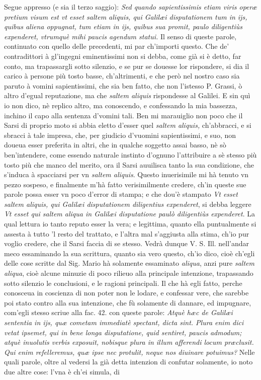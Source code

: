\documentclass[11pt,twoside,openany]{book}
\begin{document}
\par\bigskip\noindent{}\enspace Segue appresso (e sia il terzo saggio): \textit{Sed quando sapientissimis etiam viris operæ pretium visum est vt esset saltem aliquis, qui Galilæi disputationem tum in ijs, quibus aliena oppugnat, tum etiam in ijs, quibus sua promit, paulo diligentiùs expenderet, vtrumquè mihi paucis agendum statui. }Il senso di queste parole, continuato con quello delle precedenti, mi par ch'importi questo. Che de' contradittori à gl'ingegni eminentissimi non si debba, come già si è detto, far conto, ma trapassargli sotto silenzio, e se pur se douesse lor rispondere, si dia il carico à persone più tosto basse, ch'altrimenti, e che però nel nostro caso sia paruto à vomini sapientissimi, che sia ben fatto, che non l'istesso P. Grassi, ò altro d'egual reputazione, ma che \textit{saltem aliquis} rispondesse al Galilei. E sin quì io non dico, nè replico altro, ma conoscendo, e confessando la mia bassezza, inchino il capo alla sentenza d'vomini tali. Ben mi marauiglio non poco che il Sarsi di proprio moto si abbia eletto d'esser quel \textit{saltem aliquis,} ch'abbracci, e si sbracci à tale impresa, che, per giudicio d'vuomini sapientissimi, e suo, non doueua esser preferita in altri, che in qualche soggetto assai basso, nè sò ben'intendere, come essendo naturale instinto d'ognuno l'attribuire a sè stesso più tosto più che manco del merito, ora il Sarsi auuilisca tanto la sua condizione, che s'induca à spacciarsi per vn \textit{saltem aliquis}. Questo inuerisimile mi hà tenuto vn pezzo sospeso, e finalmente m'hà fatto verisimilmente credere, ch'in queste sue parole possa esser vn poco d'error di stampa; e che dou'è stampato \textit{V}\textit{t esset saltem aliquis, qui Galilæi disputationem diligentius expenderet}, si debba leggere \textit{V}\textit{t esset qui saltem aliqua in Galilæi disputatione paulò diligentiùs expenderet}. La qual lettura io tanto reputo esser la vera; e legittima, quanto ella puntualmente si assesta à tutto 'l resto del trattato, e l'altra mal s'aggiusta alla stima, ch'io pur voglio credere, che il Sarsi faccia di se stesso. Vedrà dunque V. S. Ill. nell'andar meco essaminando la sua scrittura, quanto sia vero questo, ch'io dico, cioè ch'egli delle cose scritte dal Sig. Mario hà solamente essaminato \textit{aliqua}, anzi pure \textit{saltem aliqua}, cioè alcune minuzie di poco rilieuo alla principale intenzione, trapassando sotto silenzio le conclusioni, e le ragioni principali. Il che hà egli fatto, perche conosceua in coscienza di non poter non le lodare, e confessar vere, che sarebbe poi stato contro alla sua intenzione, che fù solamente di dannare, ed impugnare, com'egli stesso scriue alla fac. 42. con queste parole: \textit{Atquè hæc de Galilæi sententia in ijs, quæ cometam immediatè spectant, dicta sint. Plura enim dici vetat ipsemet, qui in bene longa disputatione, quid sentiret, paucis admodum; atquè inuolutis verbis exposuit, nobisque plura in illum afferendi locum præclusit. }\textit{Qui enim refelleremus, quæ ipse nec protulit, neque nos diuinare potuimus?} Nelle quali parole, oltre al vedersi la già detta intenzion di confutar solamente, io noto due altre cose: l'vna è ch'ei simula, di 
\end{document}
